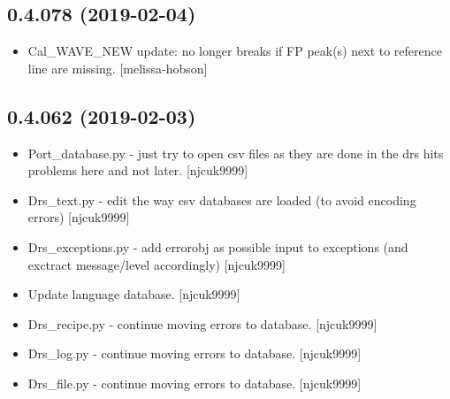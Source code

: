 \documentclass[a4paper,10pt,english]{report}
\begin{document}
\subsection{0.4.078 (2019-02-04)}
\label{\detokenize{misc/changelog:id195}}\begin{itemize}
\item {} 
Cal\_WAVE\_NEW update: no longer breaks if FP peak(s) next to reference
line are missing. {[}melissa-hobson{]}

\end{itemize}


\subsection{0.4.062 (2019-02-03)}
\label{\detokenize{misc/changelog:id196}}\begin{itemize}
\item {} 
Port\_database.py - just try to open csv files as they are done in the
drs \textendash{} hits problems here and not later. {[}njcuk9999{]}

\item {} 
Drs\_text.py - edit the way csv databases are loaded (to avoid encoding
errors) {[}njcuk9999{]}

\item {} 
Drs\_exceptions.py - add errorobj as possible input to exceptions (and
exctract message/level accordingly) {[}njcuk9999{]}

\item {} 
Update language database. {[}njcuk9999{]}

\item {} 
Drs\_recipe.py - continue moving errors to database. {[}njcuk9999{]}

\item {} 
Drs\_log.py - continue moving errors to database. {[}njcuk9999{]}

\item {} 
Drs\_file.py - continue moving errors to database. {[}njcuk9999{]}

\end{itemize}
\end{document}
